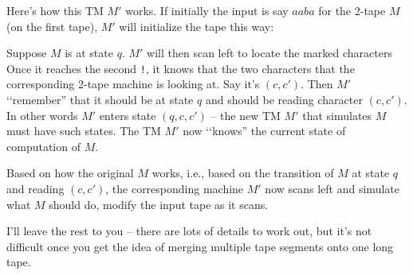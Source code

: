 Here's how this TM $M'$ works.
If initially the input is say $aaba$ for the 2-tape $M$ (on the first tape),
$M'$ will initialize the tape this way:

Suppose $M$ is at state $q$.
$M'$ will then scan left to locate the marked characters
Once it reaches the second \texttt{!}, it knows that the
two characters that the corresponding 2-tape machine is looking
at. Say it's $(c,c')$.
Then $M'$ \lq\lq remember'' that it should be at
state $q$ and should be reading character $(c,c')$.
In other words $M'$ enters state $(q,c,c')$ -- the new TM $M'$ that
simulates $M$ must have such states.
The TM $M'$ now \lq\lq knows'' the current state of computation of $M$.

Based on how the original $M$ works, i.e., based on the transition
of $M$ at state $q$ and reading $(c,c')$, the corresponding
machine $M'$ now scans left and simulate what $M$ should do,
modify the input tape as it scans.

I'll leave the rest to you -- there are lots of details to work out,
but it's not difficult once you get the idea of merging multiple
tape segments onto one long tape.
